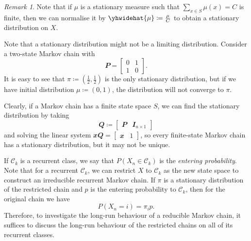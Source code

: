 \documentclass[math, code]{amznotes}
\theoremstyle{remark}
\newtheorem*{remark}{Remark}
\begin{document}
\begin{notebox}
    \begin{remark}
        Note that if $\mu$ is a stationary measure such that $\sum_{x \in S}\mu\left(x\right) = C$ is finite, then we can normalise it by $\yhwidehat{\mu} \coloneqq \frac{\mu}{C}$ to obtain a stationary distribution on $X$.
    \end{remark}
\end{notebox}
Note that a stationary distribution might not be a limiting distribution. Consider a two-state Markov chain with 
\begin{equation*}
    \mathbfit{P} = \begin{bmatrix}
        0 & 1 \\
        1 & 0
    \end{bmatrix}.
\end{equation*}
It is easy to see that $\pi \coloneqq \left(\frac{1}{2}, \frac{1}{2}\right)$ is the only stationary distribution, but if we have initial distribution $\mu \coloneqq \left(0, 1\right)$, the distribution will not converge to $\pi$.

Clearly, if a Markov chain has a finite state space $S$, we can find the stationary distribution by taking 
\begin{equation*}
    \mathbfit{Q} \coloneqq \begin{bmatrix}
        \mathbfit{P} & \mathbfit{I}_{n \times 1}
    \end{bmatrix}
\end{equation*}
and solving the linear system $\mathbfit{x}\mathbfit{Q} = \left[\begin{smallmatrix}
    \mathbfit{x} & 1
\end{smallmatrix}\right]$, so every finite-state Markov chain has a stationary distribution, but it may not be unique.

If $\mathcal{C}_k$ is a recurrent class, we say that $P\left(X_n \in \mathcal{C}_k\right)$ is the \textit{entering probability}. Note that for a recurrent $\mathcal{C}_k$, we can restrict $X$ to $\mathcal{C}_k$ as the new state space to construct an irreducible recurrent Markov chain. If $\pi$ is a stationary distribution of the restricted chain and $p$ is the entering probability to $\mathcal{C}_k$, then for the original chain we have 
\begin{equation*}
    P\left(X_n = i\right) = \pi_ip.
\end{equation*}
Therefore, to investigate the long-run behaviour of a reducible Markov chain, it suffices to discuss the long-run behaviour of the restricted chains on all of its recurrent classes.
\end{document}
